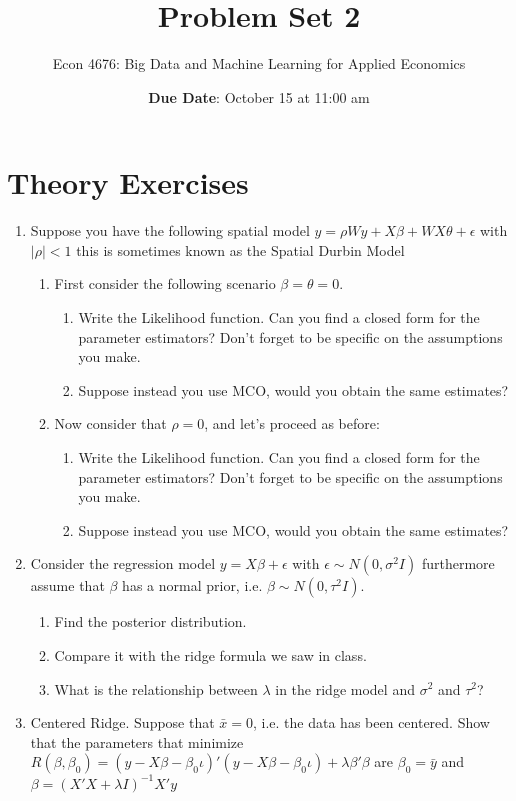 \documentclass[12pt,onecolumn]{article}
\title{Problem Set 2}
\subtitle{Econ 4676: Big Data and Machine Learning for Applied Economics}
\author{{\bf Due Date}: October 15 at 11:00 am}
\date{}
\begin{document}
\maketitle

\section{Theory Exercises}

\begin{enumerate}
  \item Suppose you have the following spatial model $y=\rho W y + X\beta + WX\theta  +\epsilon$ with $|\rho|<1$  this is sometimes known as the Spatial Durbin Model
  \begin{enumerate}
    \item First consider the following scenario  $\beta=\theta=0$. 
    \begin{enumerate}
      \item Write the Likelihood function. Can you find a closed form for the parameter estimators? Don't forget to be specific on the assumptions you make.
      \item Suppose instead you use MCO, would you obtain the same estimates? 
    \end{enumerate}  
    \item Now consider that $\rho=0$, and let's proceed as before:
    \begin{enumerate}
      \item Write the Likelihood function. Can you find a closed form for the parameter estimators? Don't forget to be specific on the assumptions you make.
      \item Suppose instead you use MCO, would you obtain the same estimates? 
  \end{enumerate}  
  \end{enumerate}  
  \item Consider the regression model $y=X\beta +\epsilon$ with $\epsilon\sim N(0,\sigma^2I)$ furthermore assume that $\beta$ has a normal prior, i.e. $\beta\sim N(0,\tau^2I)$. 
\begin{enumerate}
    \item Find the posterior distribution. 
    \item Compare it with the ridge formula we saw in class. 
    \item What is the relationship between $\lambda$ in the ridge model and $\sigma^2$ and $\tau^2$?
\end{enumerate}
  \item Centered Ridge. Suppose that $\bar x= 0$, i.e. the data has been centered. Show that the parameters that minimize $R(\beta,\beta_0) = (y-X\beta-\beta_0 \iota)'(y-X\beta-\beta_0 \iota)+ \lambda\beta'\beta$ are $\beta_0=\bar y$ and $\beta=(X'X+\lambda I)^{-1}X'y$


\end{enumerate}
\end{document}
